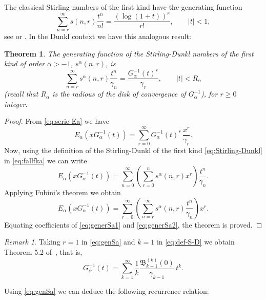 \documentclass[11pt,a4paper]{article}
\theoremstyle{plain}
\newtheorem{theorem}{Theorem}[section]
\theoremstyle{remark}
\newtheorem*{remark}{Remark}
\newcommand{\Ea}{E_{\alpha}}
\newcommand{\B}{\mathfrak{B}}
\begin{document}
The classical Stirling numbers of the first kind have the generating function
\[
  \sum_{n=r}^{\infty} s(n,r) \frac{t^n}{n!} = \frac{(\log(1+t))^r}{r!},
  \qquad |t| < 1,
\]
see \cite[\S\,51, (3)]{Jor2} or \cite[26.8.8]{Br-NIST}.
In the Dunkl context we have this analogous result:

\begin{theorem} 
The generating function of the Stirling-Dunkl numbers of the first kind of order $\alpha>-1$, $s^{\alpha}(n,r)$, is 
\begin{equation}
\label{eq:genSa} 
  \sum_{n=r}^{\infty} s^{\alpha}(n,r) \frac{t^n}{\gamma_n}
  = \frac{G_{\alpha}^{-1}(t)^r}{\gamma_r}, \qquad |t|<R_{\alpha}
\end{equation}
(recall that $R_{\alpha}$ is the radious of the disk of convergence of $G_{\alpha}^{-1}$), for $r\ge 0$ integer.
\end{theorem}

\begin{proof}
From \eqref{eq:serie-Ea} we have 
\begin{equation}
\label{eq:generSa1}
    \Ea(xG_{\alpha}^{-1}(t)) 
    = \sum_{r=0}^{\infty} G_{\alpha}^{-1}(t)^r \,\frac{x^r}{\gamma_r}.
\end{equation}
Now, using the definition of the Stirling-Dunkl of the first kind \eqref{eq:Stirling-Dunkl} in  \eqref{eq:fallfka} we can write
\[
  \Ea(xG_{\alpha}^{-1}(t))
  = \sum_{n=0}^{\infty} \left(\sum_{r=0}^{n} s^{\alpha}(n,r)x^r\right) \frac{t^n}{\gamma_n}.
\]
Applying Fubini's theorem we obtain
\begin{equation}
\label{eq:generSa2}
  \Ea(xG_{\alpha}^{-1}(t)) = \sum_{r=0}^{\infty} 
  \left(\sum_{n=r}^{\infty} s^{\alpha}(n,r)\frac{t^n}{\gamma_n}\right)x^r.
\end{equation}
Equating coefficients of \eqref{eq:generSa1} and \eqref{eq:generSa2}, the theorem is proved.
\end{proof}

\begin{remark}
Taking $r=1$ in \eqref{eq:genSa} and $k=1$ in \eqref{eq:def-S-D} we obtain Theorem 5.2 of~\cite{ELMV}, that is,
\begin{equation}
\label{eq:inversa}
  G_{\alpha}^{-1}(t)=\sum_{k=1}^{\infty}\frac{1}{k}\frac{\B_{k-1}^{(k)}(0)}{\gamma_{k-1}} \,t^k.
\end{equation}
\end{remark}

Using \eqref{eq:genSa} we can deduce the following recurrence relation:
\end{document}
